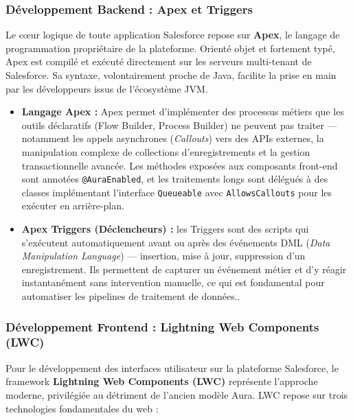\subsubsection{Développement Backend : Apex et Triggers}

Le cœur logique de toute application Salesforce repose sur \textbf{Apex}, le langage de programmation propriétaire de la plateforme. Orienté objet et fortement typé, Apex est compilé et exécuté directement sur les serveurs multi-tenant de Salesforce. Sa syntaxe, volontairement proche de Java, facilite la prise en main par les développeurs issus de l'écosystème JVM.

\begin{itemize}
    \item \textbf{Langage Apex :} Apex permet d'implémenter des processus métiers que les outils déclaratifs (Flow Builder, Process Builder) ne peuvent pas traiter --- notamment les appels asynchrones (\textit{Callouts}) vers des APIs externes, la manipulation complexe de collections d'enregistrements et la gestion transactionnelle avancée. Les méthodes exposées aux composants front-end sont annotées \texttt{@AuraEnabled}, et les traitements longs sont délégués à des classes implémentant l'interface \texttt{Queueable} avec \texttt{AllowsCallouts} pour les exécuter en arrière-plan.
    
    \item \textbf{Apex Triggers (Déclencheurs) :} les Triggers sont des scripts qui s'exécutent automatiquement avant ou après des événements DML (\textit{Data Manipulation Language}) --- insertion, mise à jour, suppression d'un enregistrement. Ils permettent de capturer un événement métier et d'y réagir instantanément sans intervention manuelle, ce qui est fondamental pour automatiser les pipelines de traitement de données.\parencite{URL18}.
\end{itemize}

\subsubsection{Développement Frontend : Lightning Web Components (LWC)}
\hypertarget{LWC}{}

Pour le développement des interfaces utilisateur sur la plateforme Salesforce, le framework \textbf{Lightning Web Components (LWC)} représente l'approche moderne, privilégiée au détriment de l'ancien modèle Aura. LWC repose sur trois technologies fondamentales du web :

